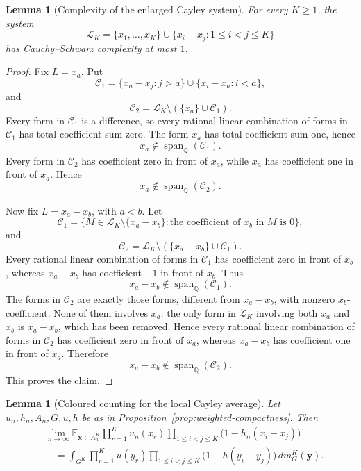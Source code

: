 \documentclass[11pt]{article}
\numberwithin{equation}{section}
\newtheorem{lemma}[theorem]{Lemma}
\newcommand{\E}{\mathbb E}
\newcommand{\1}{\mathbf 1}
\newcommand{\Span}{\operatorname{span}}
\begin{document}
\begin{lemma}[Complexity of the enlarged Cayley system]
\label{lem:cs-enlarged}
For every \(K\ge1\), the system
\[
        \mathcal L_K
        =
        \{x_1,\ldots,x_K\}
        \cup
        \{x_i-x_j:1\le i<j\le K\}
\]
has Cauchy--Schwarz complexity at most \(1\).
\end{lemma}

\begin{proof}
Fix \(L=x_a\).  Put
\[
        \mathcal C_1
        =
        \{x_a-x_j:j>a\}\cup\{x_i-x_a:i<a\},
\]
and
\[
        \mathcal C_2
        =
        \mathcal L_K\setminus(\{x_a\}\cup\mathcal C_1).
\]
Every form in \(\mathcal C_1\) is a difference, so every rational linear
combination of forms in \(\mathcal C_1\) has total coefficient sum zero.
The form \(x_a\) has total coefficient sum one, hence
\[
        x_a\notin\Span_{\mathbb Q}(\mathcal C_1).
\]
Every form in \(\mathcal C_2\) has coefficient zero in front of \(x_a\),
while \(x_a\) has coefficient one in front of \(x_a\).  Hence
\[
        x_a\notin\Span_{\mathbb Q}(\mathcal C_2).
\]

Now fix \(L=x_a-x_b\), with \(a<b\).  Let
\[
        \mathcal C_1
        =
        \{M\in\mathcal L_K\setminus\{x_a-x_b\}:
        \text{the coefficient of }x_b\text{ in }M\text{ is }0\},
\]
and
\[
        \mathcal C_2
        =
        \mathcal L_K\setminus(\{x_a-x_b\}\cup\mathcal C_1).
\]
Every rational linear combination of forms in \(\mathcal C_1\) has
coefficient zero in front of \(x_b\), whereas \(x_a-x_b\) has coefficient
\(-1\) in front of \(x_b\).  Thus
\[
        x_a-x_b\notin\Span_{\mathbb Q}(\mathcal C_1).
\]
The forms in \(\mathcal C_2\) are exactly those forms, different from
\(x_a-x_b\), with nonzero \(x_b\)-coefficient.  None of them involves
\(x_a\): the only form in \(\mathcal L_K\) involving both \(x_a\) and
\(x_b\) is \(x_a-x_b\), which has been removed.  Hence every rational
linear combination of forms in \(\mathcal C_2\) has coefficient zero in
front of \(x_a\), whereas \(x_a-x_b\) has coefficient one in front of
\(x_a\).  Therefore
\[
        x_a-x_b\notin\Span_{\mathbb Q}(\mathcal C_2).
\]
This proves the claim.
\end{proof}

\begin{lemma}[Coloured counting for the local Cayley average]
\label{lem:cayley-coloured-counting}
Let \(u_n,h_n,A_n,G,u,h\) be as in
Proposition~\ref{prop:weighted-compactness}.  Then
\[
\begin{aligned}
&\lim_{n\to\infty}
\E_{\mathbf x\in A_n^K}
        \prod_{r=1}^K u_n(x_r)
        \prod_{1\le i<j\le K}\bigl(1-h_n(x_i-x_j)\bigr) \\
&\quad =
\int_{G^K}
        \prod_{r=1}^K u(y_r)
        \prod_{1\le i<j\le K}\bigl(1-h(y_i-y_j)\bigr)
        \,dm_G^K(\mathbf y).
\end{aligned}
\]
\end{lemma}
\end{document}
